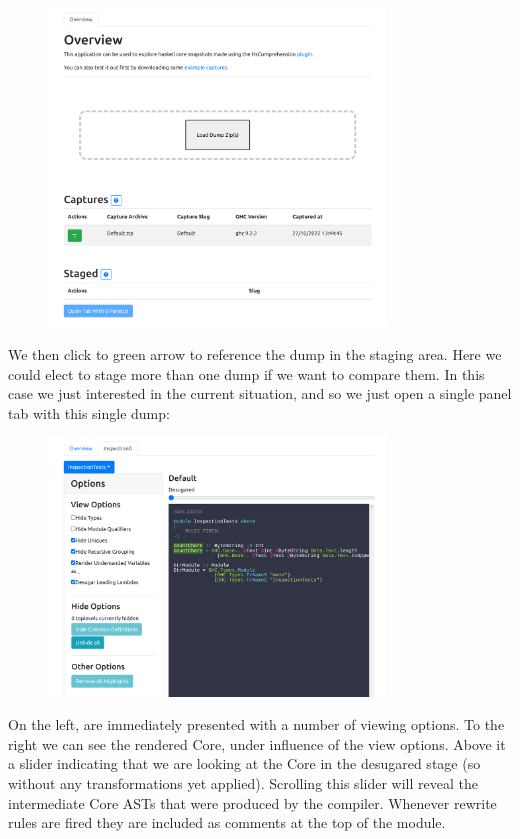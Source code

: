 \begin{figure}[H]
\centering
\includegraphics[width=0.8\textwidth]{figs/countchars_1.png}
\label{fig:countchars_1}
\end{figure}

We then click to green arrow to reference the dump in the staging area. Here we could elect to stage more
than one dump if we want to compare them. In this case we just interested in the current situation, and so we
just open a single panel tab with this single dump:


\begin{figure}[H]
\centering
\includegraphics[width=0.8\textwidth]{figs/countchars_2.png}
\label{fig:countchars_2}
\end{figure}

On the left, are immediately presented with a number of viewing options. To the right we can see the rendered
Core, under influence of the view options. Above it a slider indicating that we are looking at the
Core in the desugared stage (so without any transformations yet applied). Scrolling this slider will reveal
the intermediate Core ASTs that were produced by the compiler. Whenever rewrite rules are fired they are included
as comments at the top of the module.

